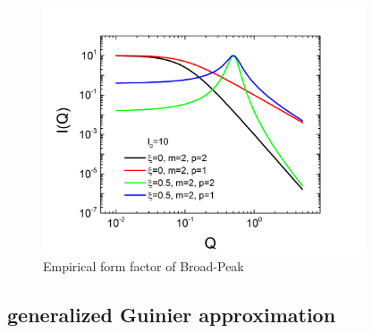 \begin{figure}[htb]
\begin{center}
\includegraphics[width=0.85\textwidth]{BroadPeak.png}
\end{center}
\caption{Empirical form factor of Broad-Peak} \label{fig:BroadPeakIq}
\end{figure}

\clearpage
\subsection{generalized Guinier approximation }
\label{sec:generalizedGuinier}  ~\\

